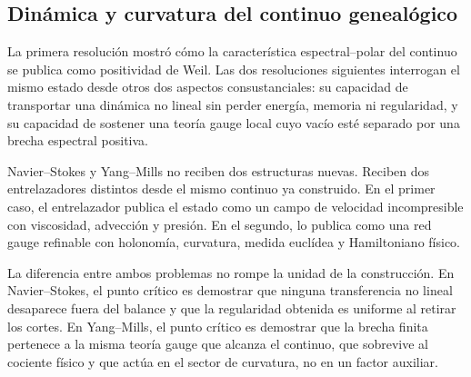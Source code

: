 \subsection{Dinámica y curvatura del continuo genealógico}
La primera resolución mostró cómo la característica espectral–polar del continuo se publica como positividad de Weil. Las dos resoluciones siguientes interrogan el mismo estado desde otros dos aspectos consustanciales: su capacidad de transportar una dinámica no lineal sin perder energía, memoria ni regularidad, y su capacidad de sostener una teoría gauge local cuyo vacío esté separado por una brecha espectral positiva.\par
Navier–Stokes y Yang–Mills no reciben dos estructuras nuevas. Reciben dos entrelazadores distintos desde el mismo continuo ya construido. En el primer caso, el entrelazador publica el estado como un campo de velocidad incompresible con viscosidad, advección y presión. En el segundo, lo publica como una red gauge refinable con holonomía, curvatura, medida euclídea y Hamiltoniano físico.\par
La diferencia entre ambos problemas no rompe la unidad de la construcción. En Navier–Stokes, el punto crítico es demostrar que ninguna transferencia no lineal desaparece fuera del balance y que la regularidad obtenida es uniforme al retirar los cortes. En Yang–Mills, el punto crítico es demostrar que la brecha finita pertenece a la misma teoría gauge que alcanza el continuo, que sobrevive al cociente físico y que actúa en el sector de curvatura, no en un factor auxiliar.\par
{}
